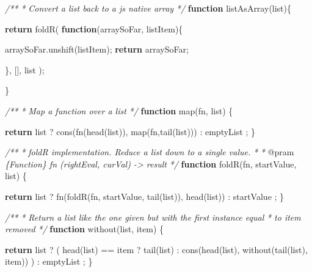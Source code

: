 \documentclass[]{article}
\newenvironment{Shaded}{}{}
\newcommand{\KeywordTok}[1]{\textcolor[rgb]{0.00,0.44,0.13}{\textbf{{#1}}}}
\newcommand{\CommentTok}[1]{\textcolor[rgb]{0.38,0.63,0.69}{\textit{{#1}}}}
\newcommand{\OtherTok}[1]{\textcolor[rgb]{0.00,0.44,0.13}{{#1}}}
\newcommand{\FunctionTok}[1]{\textcolor[rgb]{0.02,0.16,0.49}{{#1}}}
\newcommand{\NormalTok}[1]{{#1}}
\begin{document}
\begin{Shaded}
\begin{Highlighting}[]
\CommentTok{/**}
\CommentTok{ * Convert a list back to a js native array}
\CommentTok{ */}
\KeywordTok{function} \FunctionTok{listAsArray}\NormalTok{(list)\{}

   \KeywordTok{return} \FunctionTok{foldR}\NormalTok{( }\KeywordTok{function}\NormalTok{(arraySoFar, listItem)\{}
      
      \OtherTok{arraySoFar}\NormalTok{.}\FunctionTok{unshift}\NormalTok{(listItem);}
      \KeywordTok{return} \NormalTok{arraySoFar;}
           
   \NormalTok{\}, [], list );}
   
\NormalTok{\}}

\CommentTok{/**}
\CommentTok{ * Map a function over a list }
\CommentTok{ */}
\KeywordTok{function} \FunctionTok{map}\NormalTok{(fn, list) \{}

   \KeywordTok{return} \NormalTok{list}
            \NormalTok{? }\FunctionTok{cons}\NormalTok{(}\FunctionTok{fn}\NormalTok{(}\FunctionTok{head}\NormalTok{(list)), }\FunctionTok{map}\NormalTok{(fn,}\FunctionTok{tail}\NormalTok{(list)))}
            \NormalTok{: emptyList}
            \NormalTok{;}
\NormalTok{\}}

\CommentTok{/**}
\CommentTok{ * foldR implementation. Reduce a list down to a single value.}
\CommentTok{ * }
\CommentTok{ * }\NormalTok{@pram}\CommentTok{ \{Function\} fn     (rightEval, curVal) -> result }
\CommentTok{ */}
\KeywordTok{function} \FunctionTok{foldR}\NormalTok{(fn, startValue, list) \{}
      
   \KeywordTok{return} \NormalTok{list }
            \NormalTok{? }\FunctionTok{fn}\NormalTok{(}\FunctionTok{foldR}\NormalTok{(fn, startValue, }\FunctionTok{tail}\NormalTok{(list)), }\FunctionTok{head}\NormalTok{(list))}
            \NormalTok{: startValue}
            \NormalTok{;}
\NormalTok{\}}

\CommentTok{/**}
\CommentTok{ * Return a list like the one given but with the first instance equal }
\CommentTok{ * to item removed }
\CommentTok{ */}
\KeywordTok{function} \FunctionTok{without}\NormalTok{(list, item) \{}
 
  \KeywordTok{return} \NormalTok{list  }
            \NormalTok{?  ( }\FunctionTok{head}\NormalTok{(list) == item }
                     \NormalTok{? }\FunctionTok{tail}\NormalTok{(list) }
                     \NormalTok{: }\FunctionTok{cons}\NormalTok{(}\FunctionTok{head}\NormalTok{(list), }\FunctionTok{without}\NormalTok{(}\FunctionTok{tail}\NormalTok{(list), item))}
               \NormalTok{) }
            \NormalTok{: emptyList}
            \NormalTok{;}
\NormalTok{\}}


\end{Highlighting}
\end{Shaded}
\end{document}
